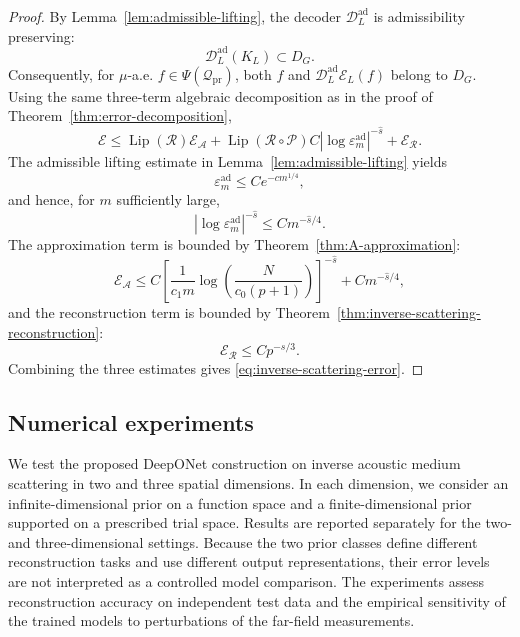 \documentclass{article}
\numberwithin{equation}{section}
\theoremstyle{plain}
\newcommand{\Lip}{\operatorname{Lip}}
\begin{document}
	\begin{proof}
	By Lemma~\ref{lem:admissible-lifting}, the decoder $\mathcal D_L^{\mathrm{ad}}$ is admissibility preserving:
	\begin{equation*}
	\mathcal D_L^{\mathrm{ad}}(K_L)\subset D_G.
	\end{equation*}
	Consequently, for $\mu$-a.e.
	$f\in\Psi(\mathcal Q_{\mathrm{pr}})$, both $f$ and
	$\mathcal D_L^{\mathrm{ad}}\mathcal E_L(f)$ belong to $D_G$. Using the same three-term algebraic decomposition as in the proof of Theorem~\ref{thm:error-decomposition},
	\begin{equation*}
	\mathscr E
	\le \Lip(\mathcal R)\mathscr E_{\mathcal A}
	+\Lip(\mathcal R\circ\mathcal P)C|\log\varepsilon_m^{\mathrm{ad}}|^{-\hat s}
	+\mathscr E_{\mathcal R}.
	\end{equation*}
	The admissible lifting estimate in Lemma~\ref{lem:admissible-lifting} yields
	\begin{equation*}
	\varepsilon_m^{\mathrm{ad}}\le Ce^{-cm^{1/4}},
	\end{equation*}
	and hence, for $m$ sufficiently large,
	\begin{equation*}
	|\log\varepsilon_m^{\mathrm{ad}}|^{-\hat s}\le Cm^{-\hat s/4}.
	\end{equation*}
	The approximation term is bounded by Theorem~\ref{thm:A-approximation}:
	\begin{equation*}
	\mathscr E_{\mathcal A}
	\le
	C\left[
	\frac{1}{c_1m}
	\log\!\left(\frac{N}{c_0(p+1)}\right)
	\right]^{-\hat s}
	+Cm^{-\hat s/4},
	\end{equation*}
	and the reconstruction term is bounded by Theorem~\ref{thm:inverse-scattering-reconstruction}:
	\begin{equation*}
	\mathscr E_{\mathcal R}\le Cp^{-s/3}.
	\end{equation*}
	Combining the three estimates gives \eqref{eq:inverse-scattering-error}.
	\end{proof}

	
	\subsection{Numerical experiments}

We test the proposed DeepONet construction on inverse acoustic medium scattering in two and three spatial dimensions. In each dimension, we consider an infinite-dimensional prior on a function space and a finite-dimensional prior supported on a prescribed trial space. Results are reported separately for the two- and three-dimensional settings. Because the two prior classes define different reconstruction tasks and use different output representations, their error levels are not interpreted as a controlled model comparison. The experiments assess reconstruction accuracy on independent test data and the empirical sensitivity of the trained models to perturbations of the far-field measurements.
\end{document}
